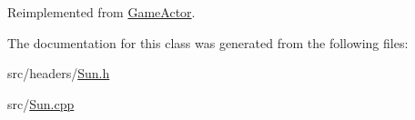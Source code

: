 Reimplemented from \hyperlink{class_game_actor_ab70229c740251fb7c4222bf579c59393}{Game\+Actor}.



The documentation for this class was generated from the following files\+:\begin{DoxyCompactItemize}
\item 
src/headers/\hyperlink{_sun_8h}{Sun.\+h}\item 
src/\hyperlink{_sun_8cpp}{Sun.\+cpp}\end{DoxyCompactItemize}
